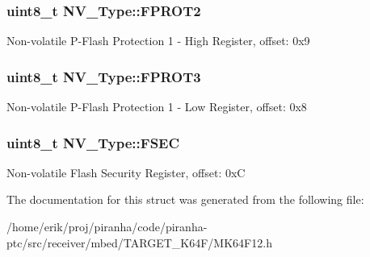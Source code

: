 \subsubsection[{\texorpdfstring{F\+P\+R\+O\+T2}{FPROT2}}]{ uint8\+\_\+t N\+V\+\_\+\+Type\+::\+F\+P\+R\+O\+T2}\hypertarget{structNV__Type_a4d8b08ba5cfdb89cf82724db412bc041}{}\label{structNV__Type_a4d8b08ba5cfdb89cf82724db412bc041}
Non-\/volatile P-\/\+Flash Protection 1 -\/ High Register, offset\+: 0x9 
\subsubsection[{\texorpdfstring{F\+P\+R\+O\+T3}{FPROT3}}]{ uint8\+\_\+t N\+V\+\_\+\+Type\+::\+F\+P\+R\+O\+T3}\hypertarget{structNV__Type_a681eb6e0560291b4c2e83e4e85923347}{}\label{structNV__Type_a681eb6e0560291b4c2e83e4e85923347}
Non-\/volatile P-\/\+Flash Protection 1 -\/ Low Register, offset\+: 0x8 
\subsubsection[{\texorpdfstring{F\+S\+EC}{FSEC}}]{ uint8\+\_\+t N\+V\+\_\+\+Type\+::\+F\+S\+EC}\hypertarget{structNV__Type_afb5e12b7f518197a87e81432749ba73d}{}\label{structNV__Type_afb5e12b7f518197a87e81432749ba73d}
Non-\/volatile Flash Security Register, offset\+: 0xC 

The documentation for this struct was generated from the following file\+:\begin{DoxyCompactItemize}
\item 
/home/erik/proj/piranha/code/piranha-\/ptc/src/receiver/mbed/\+T\+A\+R\+G\+E\+T\+\_\+\+K64\+F/M\+K64\+F12.\+h\end{DoxyCompactItemize}
